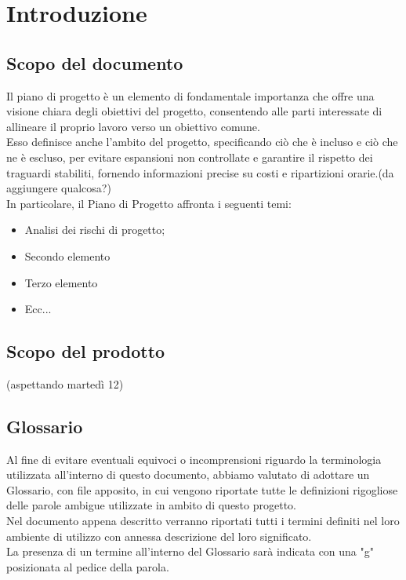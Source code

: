 

\section{Introduzione}
\label{sec:introduzione}

\subsection{Scopo del documento}
Il piano di progetto è un elemento di fondamentale importanza che offre una visione chiara degli obiettivi del progetto, 
consentendo alle parti interessate di allineare il proprio lavoro verso un obiettivo comune.\\
Esso definisce anche l'ambito del progetto, specificando ciò che è incluso e ciò che ne è escluso, per evitare espansioni 
non controllate e garantire il rispetto dei traguardi stabiliti, fornendo informazioni precise su costi e ripartizioni orarie.(da aggiungere qualcosa?)\\
In particolare, il Piano di Progetto affronta i seguenti temi:
\begin{itemize}
    \item Analisi dei rischi di progetto;
    \item Secondo elemento
    \item Terzo elemento
    \item Ecc...
\end{itemize}

\subsection{Scopo del prodotto}
(aspettando martedì 12)

\subsection{Glossario}
Al fine di evitare eventuali equivoci o incomprensioni riguardo la terminologia utilizzata all’interno di questo documento, 
abbiamo valutato di adottare un Glossario, con file apposito, in cui
vengono riportate tutte le definizioni rigogliose delle parole ambigue utilizzate in ambito di
questo progetto.\\
Nel documento appena descritto verranno riportati tutti i termini definiti nel
loro ambiente di utilizzo con annessa descrizione del loro significato.\\
La presenza di un termine all'interno del Glossario sarà indicata con una "g" posizionata al pedice della parola.

